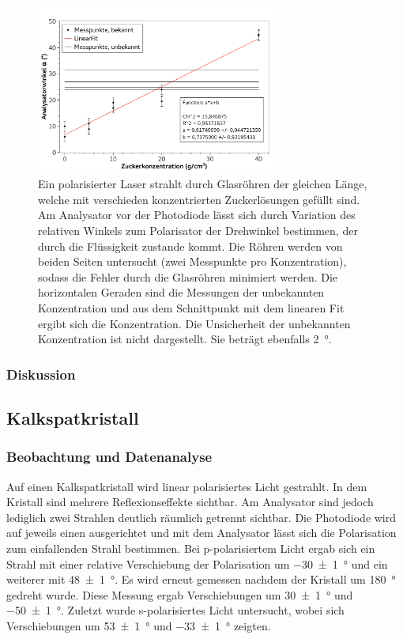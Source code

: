 \documentclass[
	a4paper,
	12pt,
	pagesize,
	ngerman
]{scrartcl}
\begin{document}
	\begin{figure}[H]
		\includegraphics[width=0.7\textwidth]{fig_Zucker}
		\centering
		\caption{Ein polarisierter Laser strahlt durch Glasröhren der gleichen Länge, welche mit verschieden konzentrierten Zuckerlösungen gefüllt sind. 
		Am Analysator vor der Photodiode lässt sich durch Variation des relativen Winkels zum Polarisator der Drehwinkel bestimmen, der durch die Flüssigkeit zustande kommt.
		Die Röhren werden von beiden Seiten untersucht (zwei Messpunkte pro Konzentration), sodass die Fehler durch die Glasröhren minimiert werden.
		Die horizontalen Geraden sind die Messungen der unbekannten Konzentration und aus dem Schnittpunkt mit dem linearen Fit ergibt sich die Konzentration.
		Die Unsicherheit der unbekannten Konzentration ist nicht dargestellt. Sie beträgt ebenfalls \SI{2}{\degree}.
		}
		\label{fig_zucker}
		\centering
	\end{figure}

	\subsubsection{Diskussion}
	
	\subsection{Kalkspatkristall}
	\subsubsection{Beobachtung und Datenanalyse}
	Auf einen Kalkspatkristall wird linear polarisiertes Licht gestrahlt.
	In dem Kristall sind mehrere Reflexionseffekte sichtbar. 
	Am Analysator sind jedoch lediglich zwei Strahlen deutlich räumlich getrennt sichtbar.
	Die Photodiode wird auf jeweils einen ausgerichtet und mit dem Analysator lässt sich die Polarisation zum einfallenden Strahl bestimmen.
	Bei p-polarisiertem Licht ergab sich ein Strahl mit einer relative Verschiebung der Polarisation um \SI{-30+-1}{\degree} und ein weiterer mit \SI{48+-1}{\degree}.
	Es wird erneut gemessen nachdem der Kristall um \SI{180}{\degree} gedreht wurde.
	Diese Messung ergab Verschiebungen um \SI{30+-1}{\degree} und \SI{-50+-1}{\degree}.
	Zuletzt wurde s-polarisiertes Licht untersucht, wobei sich Verschiebungen um \SI{53+-1}{\degree} und \SI{-33+-1}{\degree} zeigten.
\end{document}
